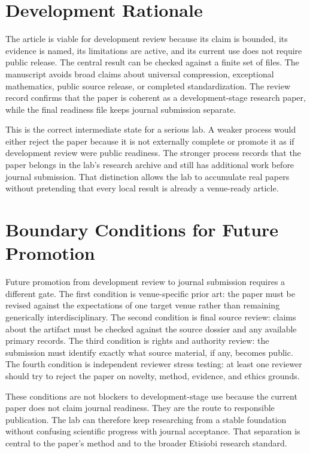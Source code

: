 \documentclass[sigconf,nonacm]{acmart}
\begin{document}
\section{Development Rationale}
The article is viable for development review because its claim is bounded, its
evidence is named, its limitations are active, and its current use does not
require public release. The central result can be checked against a finite set
of files. The manuscript avoids broad claims about universal compression,
exceptional mathematics, public source release, or completed standardization.
The review record confirms that the paper is coherent as a development-stage
research paper, while the final readiness file keeps journal submission
separate.

This is the correct intermediate state for a serious lab. A weaker process would
either reject the paper because it is not externally complete or promote it as if
development review were public readiness. The stronger process records that the
paper belongs in the lab's research archive and still has additional work before
journal submission. That distinction allows the lab to accumulate real papers
without pretending that every local result is already a venue-ready article.

\section{Boundary Conditions for Future Promotion}
Future promotion from development review to journal submission requires a
different gate. The first condition is venue-specific prior art: the paper must
be revised against the expectations of one target venue rather than remaining
generically interdisciplinary. The second condition is final source review:
claims about the artifact must be checked against the source dossier and any
available primary records. The third condition is rights and authority review:
the submission must identify exactly what source material, if any, becomes
public. The fourth condition is independent reviewer stress testing: at least one
reviewer should try to reject the paper on novelty, method, evidence, and ethics
grounds.

These conditions are not blockers to development-stage use because the current
paper does not claim journal readiness. They are the route to responsible
publication. The lab can therefore keep researching from a stable foundation
without confusing scientific progress with journal acceptance. That separation
is central to the paper's method and to the broader Etisiobi research standard.
\end{document}
